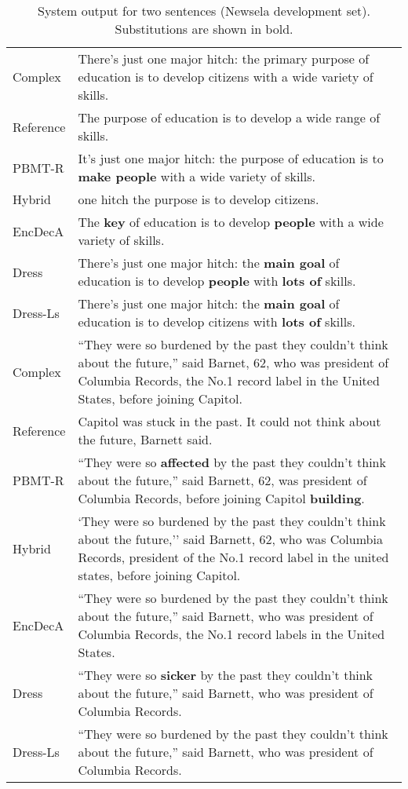 \documentclass[11pt,letterpaper]{article}
\begin{document}
\begin{table*}[t]
	\centering
\begin{tabular}{| l  p{13cm}@{~} |}
		\hline
		Complex & There's just one major hitch: the primary
		purpose of education is to develop citizens with a
		wide variety of skills. \\ 	
		Reference & The purpose of education is to {develop} a wide range of skills. \\ 
		PBMT-R & It's just one major hitch: the purpose of
		education is to {\bf make people} with a wide variety
		of skills. \\  
		Hybrid & one hitch the purpose is to develop citizens. \\
		EncDecA & The {\bf key} of education is to develop {\bf people} with a wide
		variety of skills. \\ 
		{\sc Dress} & There's just one major hitch: the {\bf main goal} of
		education is to develop {\bf people} with {\bf lots of} skills. \\
		{\sc Dress-Ls} & There's just one major hitch: the {\bf main goal} of education is to develop citizens with {\bf lots of} skills. \\\hline
		\hline
		Complex & {``They were so burdened by the past they couldn't think about the future,'' said Barnet, 62, who was president of Columbia Records, the No.1 record label in the United States, before joining Capitol.} \\ 
Reference & Capitol was stuck in the past. It could not think about the future, Barnett said. \\ 
PBMT-R & ``They were so {\bf affected} by the past they couldn't think about the future,'' said Barnett, 62, was president of Columbia Records, before joining Capitol {\bf building}. \\
		Hybrid &  `They were so burdened by the past they couldn't think about the future,'' said Barnett, 62, who was Columbia Records, president of the No.1 record label in the united states, before joining Capitol. \\
EncDecA &  ``They were so burdened by the past they couldn't think about the future,'' said Barnett, who was president of Columbia Records, the No.1 record labels in the United States. \\
{\sc Dress} & ``They were so {\bf sicker} by the past they couldn't think about the future,'' said Barnett, who was president of Columbia Records. \\
{\sc Dress-Ls} &  ``They were so burdened by the past they couldn't think about the future,'' said Barnett, who was president of Columbia Records. \\
		\hline
	\end{tabular}
	\caption{System output for two sentences (Newsela
          development set). Substitutions are shown in bold.}
	\label{tbl:example}
\end{table*}
\end{document}

